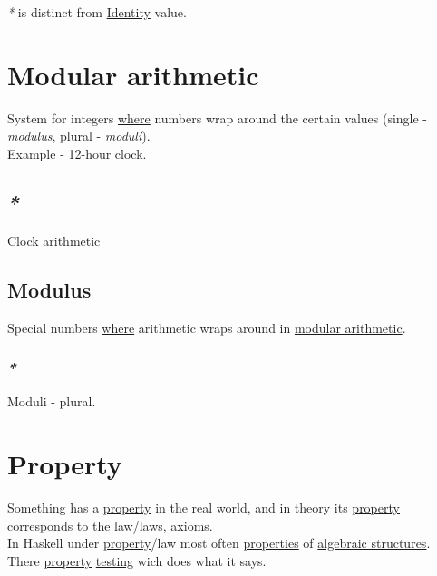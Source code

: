 \documentclass[a4paper,14pt,oneside]{book}
\begin{document}
\emph{*} is distinct from \hyperref[org8140c9c]{Identity} value.\\

\chapter{\label{orgb674510}Modular arithmetic}
\label{sec:org8814ca9}
System for integers \hyperref[orgd3dc8e4]{where} numbers wrap around the certain values (single - \emph{\hyperref[orgb81faf3]{modulus}}, plural - \emph{\hyperref[orge219dfd]{moduli}}).\\

Example - 12-hour clock.\\

\section{\emph{*}}
\label{sec:org5caef30}

\label{org5fe0817}Clock arithmetic\\

\section{\label{orgb81faf3}Modulus}
\label{sec:orgc392600}
Special numbers \hyperref[orgd3dc8e4]{where} arithmetic wraps around in \hyperref[orgb674510]{modular arithmetic}.\\

\subsection{\emph{*}}
\label{sec:org0921320}

\label{orge219dfd}Moduli - plural.\\

\chapter{\label{org91a1c9f}Property}
\label{sec:org3ad242d}
Something has a \hyperref[org91a1c9f]{property} in the real world, and in theory its \hyperref[org91a1c9f]{property} corresponds to the law/laws, axioms.\\

In Haskell under \hyperref[org91a1c9f]{property}/law most often \hyperref[org1feb373]{properties} of \hyperref[org4757347]{algebraic structures}.\\

There \hyperref[org91a1c9f]{property} \hyperref[orgb234d91]{testing} wich does what it says.\\
\end{document}

